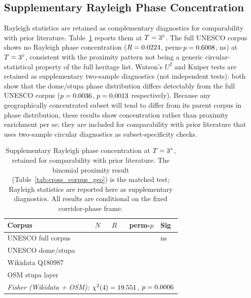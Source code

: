 \documentclass[12pt,a4paper]{article}
\newcommand{\degr}{\ifmmode^\circ\else\textdegree{}\fi}
\begin{document}
\subsection{Supplementary Rayleigh Phase Concentration}

Rayleigh statistics are retained as complementary diagnostics for
comparability with prior literature. Table~\ref{tab:rayleigh_summary} reports them at
$T = 3\degr$. The full UNESCO
corpus shows no Rayleigh phase concentration ($R = 0.0224{}$,
perm-$p = 0.6008{}$, ns) at $T = 3\degr$, consistent with the proximity
pattern not being a generic circular-statistical property of the full heritage list. Watson's $U^2$ and Kuiper tests are retained as supplementary two-sample
diagnostics (not independent tests): both show that the dome/stupa phase
distribution differs detectably from the full UNESCO corpus
($p = 0.0036{}$, $p = 0.0013{}$ respectively).
Because any geographically concentrated subset will tend to differ from its
parent corpus in phase distribution, these results show concentration rather
than proximity enrichment per se; they are included for comparability with prior
literature that uses two-sample circular diagnostics as subset-specificity checks.

\begin{table}[ht]
\centering
\caption{Supplementary Rayleigh phase concentration at $T = 3\degr$,
retained for comparability with prior literature. The binomial
proximity result (Table~\ref{tab:cross_corpus_geo}) is the matched
test; Rayleigh statistics are reported here as supplementary
diagnostics. All results are conditional on the fixed corridor-phase frame.}
\label{tab:rayleigh_summary}
\small
\begin{tabular}{llrrl}
\toprule
Corpus & $N$ & $R$ & perm-$p$ & Sig \\
\midrule
UNESCO full corpus   & \NclusterTotal{} & \circConcUnescoR{} & \circConcUnescoP{} & ns \\
UNESCO dome/stupa    & \circTwoSampNDome{} & \circConcDomeR{} & \circConcDomeP{} & \circConcDomePSig{} \\
Wikidata Q180987     & \npcNStupa{} & \circConcStupaR{} & \circConcStupaP{} & \circConcStupaPSig{} \\
OSM stupa layer      & \osmStupaTotal{} & \osmStupaRayleighR{} & \osmStupaRayleighP{} & \osmStupaRayleighSig{} \\
\midrule
\multicolumn{5}{l}{\textit{Fisher (Wikidata + OSM): $\chi^2(4) = 19.551{}$, $p = 0.0006{}$}} \\
\bottomrule
\end{tabular}
\end{table}
\end{document}
